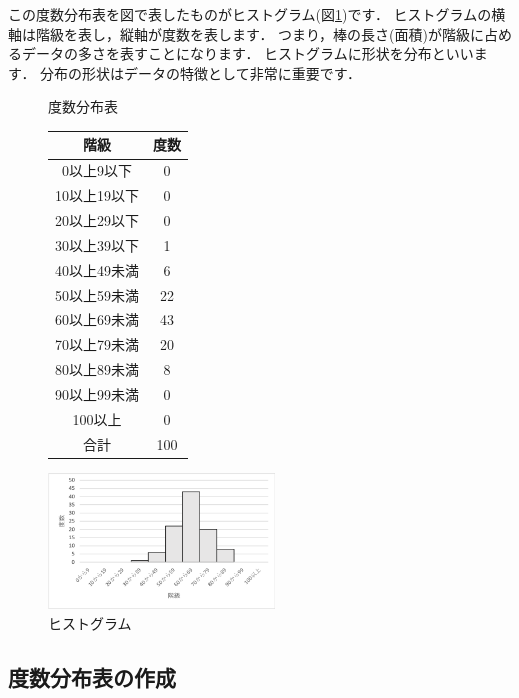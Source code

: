 この度数分布表を図で表したものがヒストグラム(図\ref{fig:histogram})です．
ヒストグラムの横軸は階級を表し，縦軸が度数を表します．
つまり，棒の長さ(面積)が階級に占めるデータの多さを表すことになります．
ヒストグラムに形状を分布といいます．
分布の形状はデータの特徴として非常に重要です．

\begin{figure}[tb]
    \begin{minipage}{0.5\hsize}
        \makeatletter
        \def\@captype{table}
        \makeatother
        \centering
        \caption{度数分布表}
        \begin{tabular}{c|c}
          階級          & 度数 \\ \hline
          0以上9以下   & 0 \\
          10以上19以下  & 0 \\
          20以上29以下  & 0 \\
          30以上39以下  & 1 \\
          40以上49未満  & 6 \\
          50以上59未満  & 22\\
          60以上69未満  & 43\\
          70以上79未満  & 20\\
          80以上89未満  & 8 \\
          90以上99未満  & 0 \\
          100以上       & 0 \\
          合計          & 100
        \end{tabular}
        \label{tab:hist}
    \end{minipage}
    \begin{minipage}{0.5\hsize}
        \centering
        \includegraphics[width=6cm]{chap1/hist.png}
        \caption{ヒストグラム}
        \label{fig:histogram}
    \end{minipage}
\end{figure}

\subsection{度数分布表の作成}
\label{sec:freq}

